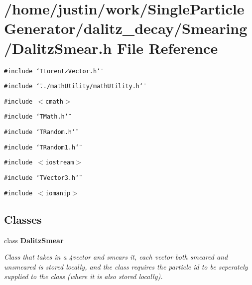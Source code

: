 \section{/home/justin/work/Single\-Particle\-Generator/dalitz\_\-decay/Smearing/Dalitz\-Smear.h File Reference}
\label{DalitzSmear_8h}
{\tt \#include \char`\"{}TLorentz\-Vector.h\char`\"{}}\par
{\tt \#include \char`\"{}../math\-Utility/math\-Utility.h\char`\"{}}\par
{\tt \#include $<$cmath$>$}\par
{\tt \#include \char`\"{}TMath.h\char`\"{}}\par
{\tt \#include \char`\"{}TRandom.h\char`\"{}}\par
{\tt \#include \char`\"{}TRandom1.h\char`\"{}}\par
{\tt \#include $<$iostream$>$}\par
{\tt \#include \char`\"{}TVector3.h\char`\"{}}\par
{\tt \#include $<$iomanip$>$}\par
\subsection*{Classes}
\begin{CompactItemize}
\item 
class \bf{Dalitz\-Smear}
\begin{CompactList}\small\item\em Class that takes in a 4vector and smears it, each vector both smeared and unsmeared is stored locally, and the class requires the particle id to be seperately supplied to the class (where it is also stored locally). \item\end{CompactList}\end{CompactItemize}
